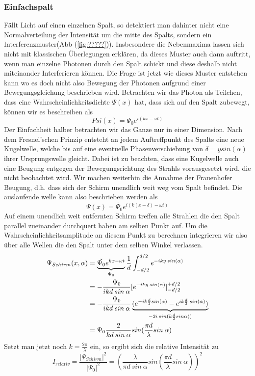 \documentclass[]{article}
\begin{document}
\subsubsection{Einfachspalt}
Fällt Licht auf einen einzelnen Spalt, so detektiert man dahinter nicht eine Normalverteilung der Intensität um die mitte des Spalts, sondern ein Interferenzmuster(Abb (\ref{fig:?????})). Insbesondere die Nebenmaxima lassen sich nicht mit klassischen Überlegungen erklären, da dieses Muster auch dann auftritt, wenn man einzelne Photonen durch den Spalt schickt und diese deshalb nicht miteinander Interferieren können.%
Die Frage ist jetzt wie dieses Muster entstehen kann wo es doch nicht also Bewegung der Photonen aufgrund einer Bewegungsgleichung beschrieben wird. Betrachten wir das Photon als Teilchen, dass eine Wahrscheinlichkeitsdichte $\Psi(x)$ hat, dass sich auf den Spalt zubewegt, können wir es beschreiben als 
\begin{equation}
	Psi(x)=\Psi_{0}e^{i(kx-\omega t)}
\end{equation}
Der Einfachheit halber betrachten wir das Ganze nur in einer Dimension. Nach dem Fresnel'schen Prinzip entsteht an jedem Auftreffpunkt des Spalts eine neue Kugelwelle, welche bis auf eine eventuelle Phasenverschiebung von $\delta =y sin(\alpha) $ ihrer Ursprungswelle gleicht. Dabei ist zu beachten, dass eine Kugelwelle auch eine Beugung entgegen der Bewegungsrichtung des Strahls vorausgesetzt wird, die nicht beobachtet wird. Wir machen weiterhin die Annahme der Frauenhofer Beugung, d.h. dass sich der Schirm unendlich weit weg vom Spalt befindet. Die auslaufende welle kann also beschrieben werden als
\begin{equation}
	\Psi(x)=\tilde{\Psi_{0}}e^{i(k(x-\delta)-\omega t)}
\end{equation}
Auf einem unendlich weit entfernten Schirm treffen alle Strahlen die den Spalt parallel zueinander durchquert haben am selben Punkt auf. Um die Wahrscheinlichkeitsamplitude an diesem Punkt zu berechnen integrieren wir also über alle Wellen die den Spalt unter dem selben Winkel verlassen.
\begin{align}%
	\Psi_{Schirm}(x,\alpha)&=\underbrace{\Tilde{\Psi_{0}}e^{kx-\omega t}}_{\Psi_{0}}\frac{1}{d}\int_{-d/2}^{d/2} e^{-iky\: sin(\alpha)}  \\ 
	&=-\frac{\Psi_{0}}{ikd \: sin \: \alpha} [e^{-iky \: sin(\alpha)}]^{+d/2}_{-d/2} \\
	&=-\frac{\Psi_{0}}{ikd \: sin \: \alpha} \underbrace{(e^{-ik\frac{d}{2}sin(\alpha)}-e^{ik\frac{d}{2}\:sin(\alpha)})}_{-2i\: sin(k\frac{d}{2}sin \alpha))} \\
	&=\Psi_{0}\frac{2}{kd\: sin \: \alpha}sin(\frac{\pi d}{\lambda}sin \: \alpha) 
\end{align}
Setzt man jetzt noch $k=\frac{2\pi}{\lambda}$ ein, so ergibt sich die relative Intensität zu
\begin{equation}
I_{relativ}=	\frac{|\Psi_{Schirm}|^2}{|\Psi_{0}|^2}=(\frac{\lambda}{\pi d \: sin \: \alpha} sin(\frac{\pi d}{\lambda} sin \: \alpha))^2
\end{equation}
\end{document}
